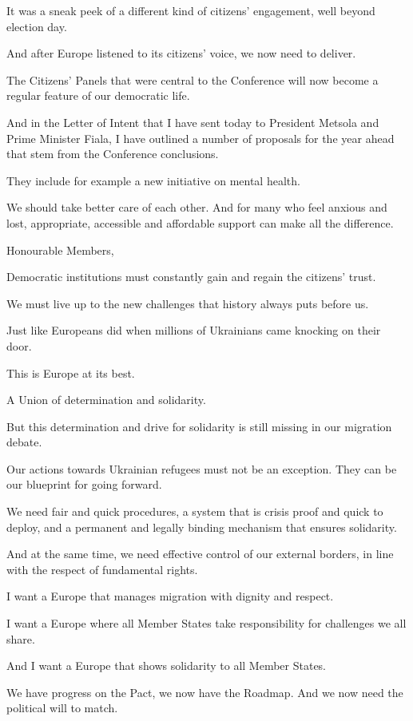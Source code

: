 \documentclass[a4paper,11pt]{article}
\begin{document}
It was a sneak peek of a different kind of citizens' engagement, well beyond election day.

And after Europe listened to its citizens' voice, we now need to deliver.

The Citizens' Panels that were central to the Conference will now become a regular feature of our democratic life.

And in the Letter of Intent that I have sent today to President Metsola and Prime Minister Fiala, I have outlined a number of proposals for the year ahead that stem from the Conference conclusions.

They include for example a new initiative on mental health.

We should take better care of each other. And for many who feel anxious and lost, appropriate, accessible and affordable support can make all the difference.

 

Honourable Members,

Democratic institutions must constantly gain and regain the citizens' trust.

We must live up to the new challenges that history always puts before us.

Just like Europeans did when millions of Ukrainians came knocking on their door.

This is Europe at its best.

A Union of determination and solidarity.

But this determination and drive for solidarity is still missing in our migration debate.

Our actions towards Ukrainian refugees must not be an exception. They can be our blueprint for going forward.

We need fair and quick procedures, a system that is crisis proof and quick to deploy, and a permanent and legally binding mechanism that ensures solidarity.

And at the same time, we need effective control of our external borders, in line with the respect of fundamental rights.

I want a Europe that manages migration with dignity and respect.

I want a Europe where all Member States take responsibility for challenges we all share.

And I want a Europe that shows solidarity to all Member States.

We have progress on the Pact, we now have the Roadmap. And we now need the political will to match.
\end{document}
